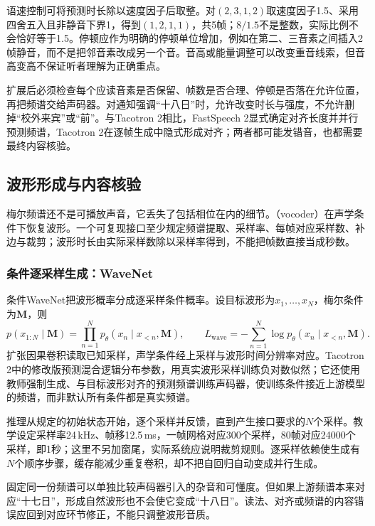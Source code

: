 语速控制可将预测时长除以速度因子后取整。对$(2,3,1,2)$取速度因子1.5、采用四舍五入且非静音下界1，得到$(1,2,1,1)$，共5帧；$8/1.5$不是整数，实际比例不会恰好等于1.5。停顿应作为明确的停顿单位增加，例如在第二、三音素之间插入2帧静音，而不是把邻音素改成另一个音。音高或能量调整可以改变重音线索，但音高变高不保证听者理解为正确重点。

扩展后必须检查每个应读音素是否保留、帧数是否合理、停顿是否落在允许位置，再把频谱交给声码器。对通知强调“十八日”时，允许改变时长与强度，不允许删掉“校外来宾”或“前”。与Tacotron 2相比，FastSpeech 2显式确定对齐长度并并行预测频谱，Tacotron 2在逐帧生成中隐式形成对齐；两者都可能发错音，也都需要最终内容核验。

\subsection{波形形成与内容核验}
\label{sec:nlp-speech-waveform}

梅尔频谱还不是可播放声音，它丢失了包括相位在内的细节。（vocoder）在声学条件下恢复波形。一个可复现接口至少规定频谱提取、采样率、每帧对应采样数、补边与裁剪；波形时长由实际采样数除以采样率得到，不能把帧数直接当成秒数。

\subsubsection{条件逐采样生成：WaveNet}
\label{sec:nlp-speech-wavenet}

条件WaveNet把波形概率分成逐采样条件概率。设目标波形为$x_1,\ldots,x_N$，梅尔条件为$\bm{M}$，则
\begin{equation}
 p(x_{1:N}\mid\bm{M})
   =\prod_{n=1}^{N}p_\theta(x_n\mid x_{<n},\bm{M}),
 \qquad
 L_{\mathrm{wave}}=-\sum_{n=1}^{N}
       \log p_\theta(x_n\mid x_{<n},\bm{M}).
 \label{eq:nlp-speech-wavenet}
\end{equation}
扩张因果卷积读取已知采样，声学条件经上采样与波形时间分辨率对应。Tacotron 2中的修改版预测混合逻辑分布参数，用真实波形采样训练负对数似然；它还使用教师强制生成、与目标波形对齐的预测频谱训练声码器，使训练条件接近上游模型的频谱，而非默认所有条件都是真实频谱。

推理从规定的初始状态开始，逐个采样并反馈，直到产生接口要求的$N$个采样。教学设定采样率24\,kHz、帧移12.5\,ms，一帧网格对应300个采样，80帧对应24000个采样，即1秒；这里不另加窗尾，实际系统应说明裁剪规则。逐采样依赖使生成有$N$个顺序步骤，缓存能减少重复卷积，却不把自回归自动变成并行生成。

固定同一份频谱可以单独比较声码器引入的杂音和可懂度。但如果上游频谱本来对应“十七日”，形成自然波形也不会使它变成“十八日”。读法、对齐或频谱的内容错误应回到对应环节修正，不能只调整波形音质。

